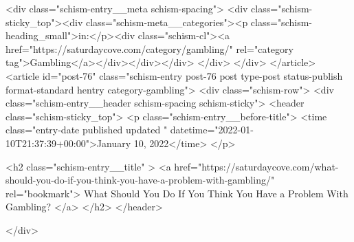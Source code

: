 {		<div class="schism-entry__meta schism-spacing">			<div class="schism-sticky_top"><div class="schism-meta__categories"><p class="schism-heading_small">in:</p><div class="schism-cl"><a href="https://saturdaycove.com/category/gambling/" rel="category tag">Gambling</a></div></div></div>		</div>
	</div>
</article>
<article id="post-76" class="schism-entry post-76 post type-post status-publish format-standard hentry category-gambling">
	<div class="schism-row">		<div class="schism-entry__header schism-spacing schism-sticky">			<header class="schism-sticky_top">				<p class="schism-entry__before-title">
					<time class="entry-date published updated " datetime="2022-01-10T21:37:39+00:00">January 10, 2022</time>				</p>

				<h2 class="schism-entry__title" >
					<a href="https://saturdaycove.com/what-should-you-do-if-you-think-you-have-a-problem-with-gambling/" rel="bookmark">
						What Should You Do If You Think You Have a Problem With Gambling?					</a>
				</h2>
			</header>

					</div>

}

